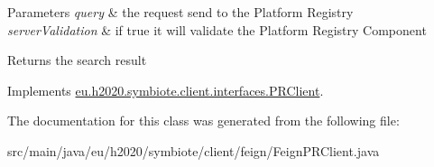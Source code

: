 \begin{DoxyParams}{Parameters}
{\em query} & the request send to the Platform Registry \\
\hline
{\em server\+Validation} & if true it will validate the Platform Registry Component \\
\hline
\end{DoxyParams}
\begin{DoxyReturn}{Returns}
the search result 
\end{DoxyReturn}


Implements \hyperlink{interfaceeu_1_1h2020_1_1symbiote_1_1client_1_1interfaces_1_1PRClient_a74bab2b341b6e1086c0b88e01e1e00f7}{eu.\+h2020.\+symbiote.\+client.\+interfaces.\+P\+R\+Client}.



The documentation for this class was generated from the following file\+:\begin{DoxyCompactItemize}
\item 
src/main/java/eu/h2020/symbiote/client/feign/Feign\+P\+R\+Client.\+java\end{DoxyCompactItemize}
